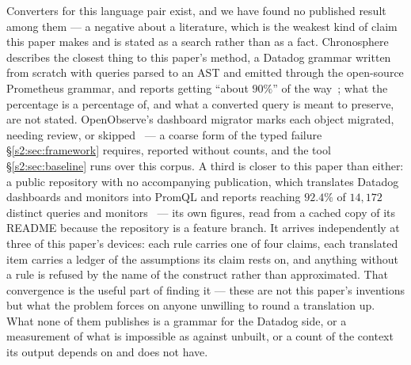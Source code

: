 Converters for this language pair exist, and we have found no published result among them
--- a negative about a literature, which is the weakest kind of claim this paper makes and
is stated as a search rather than as a fact. Chronosphere describes the closest thing to
this paper's method, a Datadog grammar written from scratch with queries parsed to an AST
and emitted through the open-source Prometheus grammar, and reports getting ``about
$90\%$'' of the way~\citep{marcopoli2024}; what the percentage is a percentage of, and what
a converted query is meant to preserve, are not stated. OpenObserve's dashboard migrator
marks each object migrated, needing review, or skipped~\citep{openobserve} --- a coarse
form of the typed failure \S\ref{s2:sec:framework} requires, reported without counts, and
the tool \S\ref{s2:sec:baseline} runs over this corpus. A third is closer to this paper
than either: a public repository with no accompanying publication, which translates Datadog
dashboards and monitors into PromQL and reports reaching $92.4\%$ of $14{,}172$ distinct
queries and monitors~\citep{dd2dash0} --- its own figures, read from a cached copy of its
README because the repository is a feature branch. It arrives independently at three of
this paper's devices: each rule carries one of four claims, each translated item carries a
ledger of the assumptions its claim rests on, and anything without a rule is refused by
the name of the construct rather than approximated. That convergence is the useful part of
finding it --- these are not this paper's inventions but what the problem forces on anyone
unwilling to round a translation up. What none of them publishes is a grammar for the
Datadog side, or a measurement of what is impossible as against unbuilt, or a count of the
context its output depends on and does not have.


